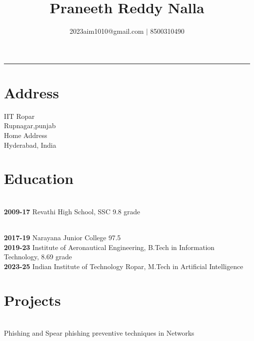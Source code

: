 \documentclass[10pt]{article}
\title{\textbf{Praneeth Reddy Nalla}}
\author{2023aim1010@gmail.com $|$ 8500310490}
\date{}
\begin{document}
\maketitle
\par\noindent\rule{\textwidth}{0.4pt}

\section*{Address}
IIT Ropar
\\Rupnagar,punjab
\vspace{2mm}
\\Home Address
\\Hyderabad, India
\section*{Education}
\\
\textbf{2009-17}\hspace{5mm} Revathi High School, SSC 9.8 grade

\\
\vspace{5mm}
\textbf{2017-19}\hspace{5mm} Narayana Junior College 97.5%
\\
\vspace{5mm}
\textbf{2019-23}\hspace{5mm} Institute of Aeronautical Engineering, B.Tech in Information Technology, 8.69 grade
\\
\vspace{5mm}
\textbf{2023-25}\hspace{5mm} Indian Institute of Technology Ropar, M.Tech in Artificial Intelligence
\section*{Projects \cite{kernighan2002c}}
\\Phishing and Spear phishing preventive techniques in Networks \cite{kamthane2006programming}



\
\end{document}
